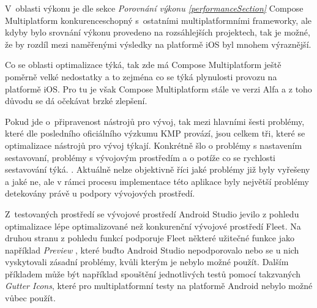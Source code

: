 V~oblasti výkonu je dle sekce \textit{Porovnání výkonu \ref{performanceSection}} Compose Multiplatform konkurenceschopný s~ostatními 
multiplatformními frameworky, ale kdyby bylo srovnání výkonu provedeno na rozsáhlejších projektech, tak je možné, že by rozdíl mezi 
naměřenými výsledky na platformě iOS byl mnohem výraznější.

Co se oblasti optimalizace týká, tak zde má Compose Multiplatform ještě poměrně velké nedostatky a to zejména co se týká plynulosti
provozu na platformě iOS. Pro tu je však Compose Multiplatform stále ve verzi Alfa a z toho důvodu se dá očekávat brzké zlepšení. \cite{KMPRoaddMap}

Pokud jde o~připravenost nástrojů pro vývoj, tak mezi hlavními šesti problémy, které dle posledního oficiálního výzkumu KMP
provází, jsou celkem tři, které se optimalizace nástrojů pro vývoj týkají. Konkrétně šlo o problémy s nastavením sestavovaní, problémy s 
vývojovým prostředím a o potíže co se rychlosti sestavování týká. \cite{imgSurvey}. Aktuálně nelze objektivně říci jaké problémy již byly 
vyřešeny a jaké ne, ale v rámci procesu implementace této aplikace byly největší problémy detekovány právě u podpory vývojových prostředí.

Z~testovaných prostředí se vývojové prostředí Android Studio jevilo z pohledu optimalizace lépe optimalizované než konkurenční vývojové 
prostředí Fleet. Na druhou stranu z pohledu funkcí podporuje Fleet některé užitečné funkce jako například \textit{Preview} \cite{previewCompose}, které buďto
Android Studio nepodporovalo nebo se u nich vyskytovali zásadní problémy, kvůli kterým je nebylo možné použít. Dalším příkladem může být 
například spouštění jednotlivých testů pomocí takzvaných \textit{Gutter Icons}, které pro multiplatformní testy na platformě Android nebylo možné vůbec použít. \cite{gutter}



